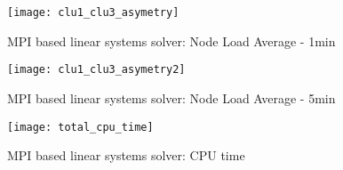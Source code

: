 \begin{figure}[ht]
\centering
\texttt{[image: clu1\_clu3\_asymetry]}
\caption{MPI based linear systems solver: Node Load Average - 1min}
\label{fig:clu1_clu3_asymetry}
\end{figure}

\begin{figure}[ht]
\centering
\texttt{[image: clu1\_clu3\_asymetry2]}
\caption{MPI based linear systems solver: Node Load Average - 5min}
\label{fig:clu1_clu3_asymetry2}
\end{figure}

\begin{figure}[ht]
\centering
\texttt{[image: total\_cpu\_time]}
\caption{MPI based linear systems solver: CPU time}
\label{fig:total_cpu_time}
\end{figure}
